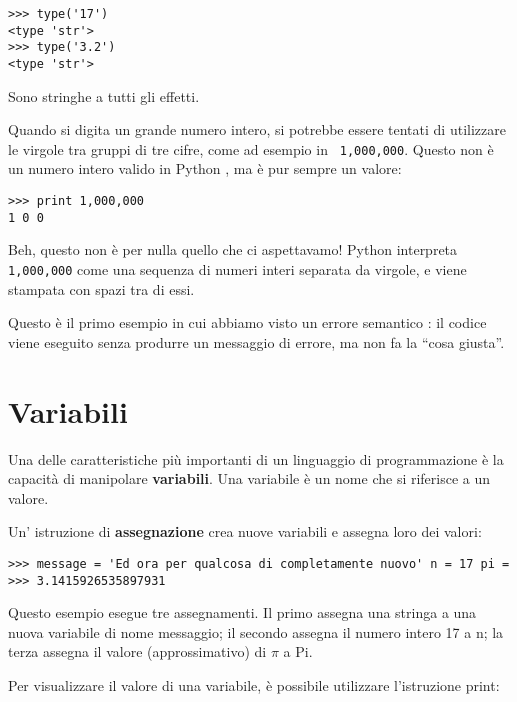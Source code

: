 
\beforeverb \begin{verbatim}
>>> type('17')
<type 'str'>
>>> type('3.2')
<type 'str'> \end{verbatim} \afterverb
%
Sono stringhe a tutti gli effetti.


Quando si digita un grande numero intero, si potrebbe essere tentati di
utilizzare le virgole tra gruppi di tre cifre, come ad esempio in {\tt
1,000,000}. Questo non \`{e} un numero intero valido in Python , ma
\`{e} pur sempre un valore:

\beforeverb \begin{verbatim}
>>> print 1,000,000
1 0 0 \end{verbatim} \afterverb
%
Beh, questo non \`{e} per nulla quello che ci aspettavamo! Python
interpreta {\tt 1,000,000} come una sequenza di numeri interi separata
da virgole, e viene stampata con spazi tra di essi.

  

Questo \`{e} il primo esempio in cui abbiamo visto un errore semantico :
il codice viene eseguito senza produrre un messaggio di errore, ma non
fa la {``}cosa giusta''.

\section{Variabili}  

Una delle caratteristiche pi\`{u} importanti di un linguaggio di
programmazione \`{e} la capacit\`{a} di manipolare \textbf{variabili}.
Una variabile \`{e} un nome che si riferisce a un valore.

Un' istruzione di \textbf{assegnazione} crea nuove variabili e assegna
loro dei valori:

\beforeverb \begin{verbatim}
>>> message = 'Ed ora per qualcosa di completamente nuovo' n = 17 pi =
>>> 3.1415926535897931
\end{verbatim} \afterverb
%
%
Questo esempio esegue tre assegnamenti. Il primo assegna una stringa a
una nuova variabile di nome messaggio; il secondo assegna il numero
intero 17 a n; la terza assegna il valore (approssimativo) di $\pi$ a
Pi.


Per visualizzare il valore di una variabile, \`{e} possibile utilizzare
l'istruzione print:

